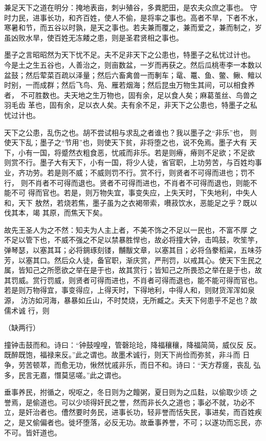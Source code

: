 \documentclass[]{article}
\begin{document}
兼足天下之道在明分：掩地表亩，刺屮殖谷，多粪肥田，是农夫众庶之事也。
守时力民，进事长功，和齐百姓，使人不偷，是将率之事也。高者不旱，下者不水，
寒暑和节，而五谷以时孰，是天之事也。若夫兼而覆之，兼而爱之，兼而制之，岁
虽凶败水旱，使百姓无冻餧之患，则是圣君贤相之事也。

墨子之言昭昭然为天下忧不足。夫不足非天下之公患也，特墨子之私忧过计也。
今是土之生五谷也，人善治之，则亩数盆，一岁而再获之。然后瓜桃枣李一本数以
盆鼓；然后荤菜百疏以泽量；然后六畜禽兽一而剸车；鼋、鼍、鱼、鳖、鳅、鳣以
时别，一而成群；然后飞鸟、凫、雁若烟海；然后昆虫万物生其间，可以相食养者，
不可胜数也。夫天地之生万物也，固有余，足以食人矣；麻葛茧丝、鸟兽之羽毛齿
革也，固有余，足以衣人矣。夫有余不足，非天下之公患也，特墨子之私忧过计也。

天下之公患，乱伤之也。胡不尝试相与求乱之者谁也？我以墨子之``非乐''也，
则使天下乱；墨子之``节用''也，则使天下贫，非将堕之也，说不免焉。墨子大有
天下，小有一国，将蹙然衣粗食恶，忧戚而非乐。若是则瘠，瘠则不足欲；不足欲
则赏不行。墨子大有天下，小有一国，将少人徒，省官职，上功劳苦，与百姓均事
业，齐功劳。若是则不威；不威则罚不行。赏不行，则贤者不可得而进也；罚不行，
则不肖者不可得而退也。贤者不可得而进也，不肖者不可得而退也，则能不能不可
得而官也。若是，则万物失宜，事变失应，上失天时，下失地利，中失人和，天下
敖然，若烧若焦，墨子虽为之衣褐带索，嚽菽饮水，恶能足之乎？既以伐其本，竭
其原，而焦天下矣。

故先王圣人为之不然：知夫为人主上者，不美不饰之不足以一民也，不富不厚
之不足以管下也，不威不强之不足以禁暴胜悍也，故必将撞大钟，击鸣鼓，吹笙竽，
弹琴瑟，以塞其耳；必将錭琢刻镂，黼黻文章，以塞其目；必将刍豢稻粱，五味芬
芳，以塞其口。然后众人徒，备官职，渐庆赏，严刑罚，以戒其心。使天下生民之
属，皆知己之所愿欲之举在是于也，故其赏行；皆知己之所畏恐之举在是于也，故
其罚威。赏行罚威，则贤者可得而进也，不肖者可得而退也，能不能可得而官也。
若是则万物得宜，事变得应，上得天时，下得地利，中得人和，则财货浑浑如泉源，
汸汸如河海，暴暴如丘山，不时焚烧，无所臧之。夫天下何患乎不足也？故儒术诚
行，则

（缺两行）

撞钟击鼓而和。诗曰：``钟鼓喤喤，管磬玱玱，降福穰穰，降福简简，威仪反
反。既醉既饱，福禄来反。''此之谓也。故墨术诚行，则天下尚俭而弥贫，非斗而
日争，劳苦顿萃，而愈无功，愀然忧戚非乐，而日不和。诗曰：``天方荐瘥，丧乱
弘多，民言无嘉，憯莫惩嗟。''此之谓也。

垂事养民，拊循之，唲呕之，冬日则为之饘粥，夏日则为之瓜麮，以偷取少顷
之誉焉，是偷道也。可以少顷得奸民之誉，然而非长久之道也；事必不就，功必不
立，是奸治者也。傮然要时务民，进事长功，轻非誉而恬失民，事进矣，而百姓疾
之，是又偷偏者也。徙坏堕落，必反无功。故垂事养誉，不可；以遂功而忘民，亦
不可。皆奸道也。
\end{document}
